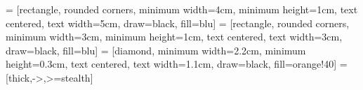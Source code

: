 \usepackage[T1]{fontenc}
\usepackage{times,newtxmath,newtxtext}
\usepackage[utf8]{inputenc}
\usepackage{subcaption}
\usepackage{setspace}
\usepackage{multirow}
\usepackage{multicol}
\usepackage[tableposition=top,justification=centering]{caption}
\usepackage[table,xcdraw]{xcolor}
\usepackage{titlesec}
\usepackage{indentfirst}
\usepackage{enumitem}
\usepackage{overpic}
\usepackage{tikz}

\setlength{\parindent}{1cm}

\captionsetup[table]{labelsep=space}
\captionsetup[figure]{labelsep=space}

\usetikzlibrary{shapes.geometric, arrows}
 = [rectangle, rounded corners, minimum width=4cm, minimum height=1cm, text centered, text width=5cm, draw=black, fill=blu]
 = [rectangle, rounded corners, minimum width=3cm, minimum height=1cm, text centered, text width=3cm, draw=black, fill=blu]
 = [diamond, minimum width=2.2cm, minimum height=0.3cm, text centered, text width=1.1cm, draw=black, fill=orange!40]
 = [thick,->,>=stealth]

\usepackage{gensymb}
\usepackage{notoccite}
\usepackage{float}
\usepackage{hyperref}
\hypersetup{
    colorlinks,
    citecolor=black,
    filecolor=black,
    linkcolor=black,
    urlcolor=black,
    linkbordercolor=red
}
\usepackage{indentfirst}
\usepackage{amsmath}
\usepackage{longtable}